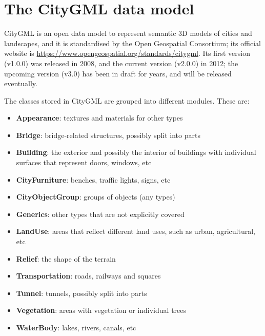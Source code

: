 %
\section[CityGML data model]{The CityGML data model}%

CityGML is an open data model to represent semantic 3D models of cities and landscapes, and it is standardised by the Open Geospatial Consortium; its official website is \url{https://www.opengeospatial.org/standards/citygml}.
Its first version (v1.0.0) was released in 2008, and the current version (v2.0.0) in 2012; the upcoming version (v3.0) has been in draft for years, and will be released eventually.

The classes stored in CityGML are grouped into different modules. These are:
\begin{itemize}
  \item \textbf{Appearance}: textures and materials for other types
  \item \textbf{Bridge}: bridge-related structures, possibly split into parts
  \item \textbf{Building}: the exterior and possibly the interior of buildings with individual surfaces that represent doors, windows, etc
  \item \textbf{CityFurniture}: benches, traffic lights, signs, etc
  \item \textbf{CityObjectGroup}: groups of objects (any types) 
  \item \textbf{Generics}: other types that are not explicitly covered
  \item \textbf{LandUse}: areas that reflect different land uses, such as urban, agricultural, etc
  \item \textbf{Relief}: the shape of the terrain
  \item \textbf{Transportation}: roads, railways and squares
  \item \textbf{Tunnel}: tunnels, possibly split into parts
  \item \textbf{Vegetation}: areas with vegetation or individual trees
  \item \textbf{WaterBody}: lakes, rivers, canals, etc
\end{itemize}

%



